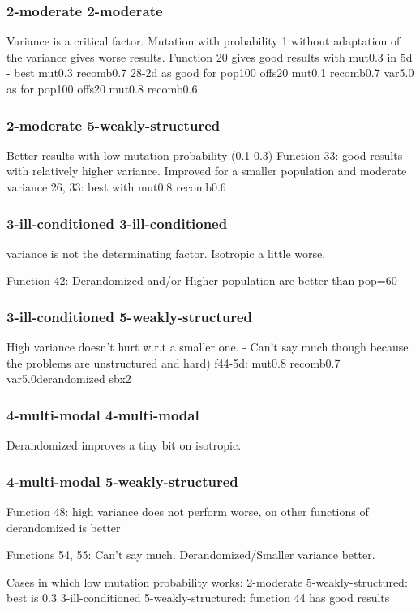 \documentclass{sig-alternate}
\begin{document}
\subsubsection*{2-moderate 2-moderate}
Variance is a critical factor. 
Mutation with probability 1 without adaptation of the variance gives worse results.
Function 20 gives good results with mut0.3 in 5d - best mut0.3 recomb0.7 
28-2d as good for pop100 offs20 mut0.1 recomb0.7 var5.0 as for pop100 offs20 mut0.8 recomb0.6

\subsubsection*{2-moderate 5-weakly-structured}
Better results with low mutation probability (0.1-0.3)
Function 33: good results with relatively higher variance. Improved for a smaller population and moderate variance
26, 33: best with mut0.8 recomb0.6

\subsubsection*{3-ill-conditioned 3-ill-conditioned} 
variance is not the determinating factor. Isotropic a little worse.

Function 42: Derandomized and/or Higher population are better than pop=60

\subsubsection*{3-ill-conditioned 5-weakly-structured} 
High variance doesn't hurt w.r.t a smaller one. - 
Can't say much though because the problems are unstructured and hard)
f44-5d: mut0.8 recomb0.7 var5.0derandomized sbx2

\subsubsection*{4-multi-modal 4-multi-modal} 
Derandomized improves a tiny bit on isotropic.
\subsubsection*{4-multi-modal 5-weakly-structured}
 Function 48: high variance does not perform worse, on other functions of  derandomized is better
								    
Functions 54, 55: Can't say much. Derandomized/Smaller variance better.

Cases in which low mutation probability works:
2-moderate 5-weakly-structured: best is 0.3
3-ill-conditioned 5-weakly-structured: function 44 has good results
\end{document}
